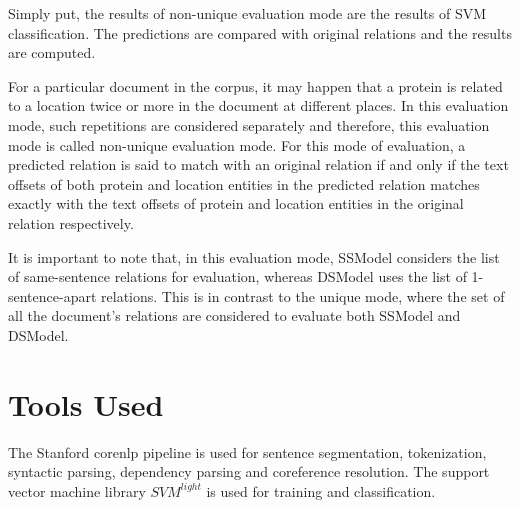 Simply put, the results of non-unique evaluation mode are the results of SVM classification. The predictions are compared with original relations and the results are computed.

For a particular document in the corpus, it may happen that a protein is related to a location twice or more in the document at different places. In this evaluation mode,  such repetitions are considered separately and therefore, this evaluation mode is called non-unique evaluation mode. For this mode of evaluation, a predicted relation is said to match with an original relation if and only if the text offsets of both protein and location entities in the predicted relation matches exactly with the text offsets of protein and location entities in the original relation respectively.

It is important to note that, in this evaluation mode, SSModel considers the list of same-sentence relations for evaluation, whereas DSModel uses the list of 1-sentence-apart relations. This is in contrast to the unique mode, where the set of all the document's relations are considered to evaluate both SSModel and DSModel.

\section{Tools Used}\label{sec:tools}

The Stanford corenlp pipeline \cite{manning2014stanford} is used for sentence segmentation, tokenization, syntactic parsing, dependency parsing and coreference resolution. The support vector machine library $SVM^{light}$ \cite{joachims1999making} is used for training and classification.
